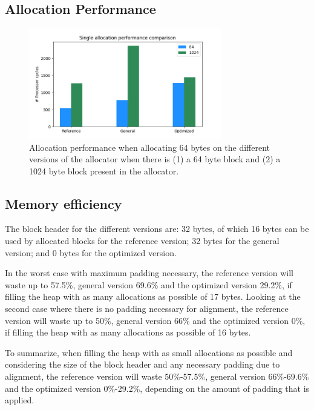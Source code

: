 
\subsection{Allocation Performance}
\label{sec:allocation-performance}

\begin{figure}[H]
    \centering
    \includegraphics[width=0.75\textwidth]{figures/allocation_performance.png}
    \caption{Allocation performance when allocating 64 bytes on the different versions of the allocator when there is (1) a 64 byte block and (2) a 1024 byte block present in the allocator.}
    \label{fig:allocation_performance}
\end{figure}

\subsection{Memory efficiency}

The block header for the different versions are: 32 bytes, of which 16 bytes can be used by allocated blocks for the reference version; 32 bytes for the general version; and 0 bytes for the optimized version. 

In the worst case with maximum padding necessary, the reference version will waste up to 57.5\%, general version 69.6\% and the optimized version 29.2\%, if filling the heap with as many allocations as possible of 17 bytes. Looking at the second case where there is no padding necessary for alignment, the reference version will waste up to 50\%, general version 66\% and the optimized version 0\%, if filling the heap with as many allocations as possible of 16 bytes.

To summarize, when filling the heap with as small allocations as possible and considering the size of the block header and any necessary padding due to alignment, the reference version will waste 50\%-57.5\%, general version 66\%-69.6\% and the optimized version 0\%-29.2\%, depending on the amount of padding that is applied.

